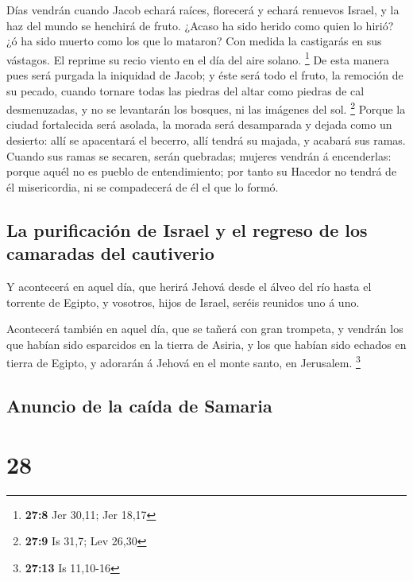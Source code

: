  Días vendrán cuando Jacob echará raíces, florecerá y
echará renuevos Israel, y la haz del mundo se henchirá de fruto.
 ¿Acaso ha sido herido como quien lo hirió? ¿ó ha sido
muerto como los que lo mataron?  Con medida la castigarás
en sus vástagos. El reprime su recio viento en el día del aire solano.
\footnote{\textbf{27:8} Jer 30,11; Jer 18,17}  De esta
manera pues será purgada la iniquidad de Jacob; y éste será todo el
fruto, la remoción de su pecado, cuando tornare todas las piedras del
altar como piedras de cal desmenuzadas, y no se levantarán los bosques,
ni las imágenes del sol. \footnote{\textbf{27:9} Is 31,7; Lev 26,30}
 Porque la ciudad fortalecida será asolada, la morada
será desamparada y dejada como un desierto: allí se apacentará el
becerro, allí tendrá su majada, y acabará sus ramas. 
Cuando sus ramas se secaren, serán quebradas; mujeres vendrán á
encenderlas: porque aquél no es pueblo de entendimiento; por tanto su
Hacedor no tendrá de él misericordia, ni se compadecerá de él el que lo
formó.

\hypertarget{la-purificaciuxf3n-de-israel-y-el-regreso-de-los-camaradas-del-cautiverio}{%
\subsection{La purificación de Israel y el regreso de los camaradas del
cautiverio}\label{la-purificaciuxf3n-de-israel-y-el-regreso-de-los-camaradas-del-cautiverio}}

 Y acontecerá en aquel día, que herirá Jehová desde el
álveo del río hasta el torrente de Egipto, y vosotros, hijos de Israel,
seréis reunidos uno á uno.

 Acontecerá también en aquel día, que se tañerá con gran
trompeta, y vendrán los que habían sido esparcidos en la tierra de
Asiria, y los que habían sido echados en tierra de Egipto, y adorarán á
Jehová en el monte santo, en Jerusalem. \footnote{\textbf{27:13} Is
  11,10-16}

\hypertarget{anuncio-de-la-cauxedda-de-samaria}{%
\subsection{Anuncio de la caída de
Samaria}\label{anuncio-de-la-cauxedda-de-samaria}}

\hypertarget{section-27}{%
\section{28}\label{section-27}}

